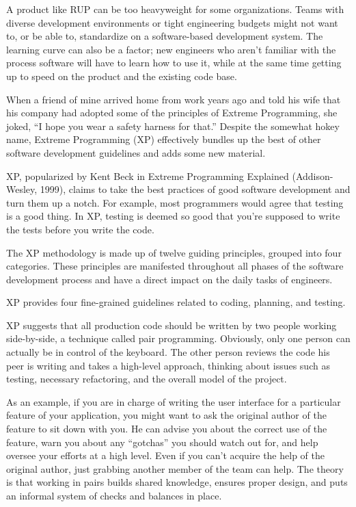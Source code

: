 A product like RUP can be too heavyweight for some organizations. Teams with diverse development environments or tight engineering budgets might not want to, or be able to, standardize on a software-based development system. The learning curve can also be a factor; new engineers who aren’t familiar with the process software will have to learn how to use it, while at the same time getting up to speed on the product and the existing code base.


When a friend of mine arrived home from work years ago and told his wife that his company had adopted some of the principles of Extreme Programming, she joked, “I hope you wear a safety harness for that.” Despite the somewhat hokey name, Extreme Programming (XP) effectively bundles up the best of other software development guidelines and adds some new material.

XP, popularized by Kent Beck in Extreme Programming Explained (Addison-Wesley, 1999), claims to take the best practices of good software development and turn them up a notch. For example, most programmers would agree that testing is a good thing. In XP, testing is deemed so good that you’re supposed to write the tests before you write the code.


The XP methodology is made up of twelve guiding principles, grouped into four categories. These principles are manifested throughout all phases of the software development process and have a direct impact on the daily tasks of engineers.


XP provides four fine-grained guidelines related to coding, planning, and testing.


XP suggests that all production code should be written by two people working side-by-side, a technique called pair programming. Obviously, only one person can actually be in control of the keyboard. The other person reviews the code his peer is writing and takes a high-level approach, thinking about issues such as testing, necessary refactoring, and the overall model of the project.

As an example, if you are in charge of writing the user interface for a particular feature of your application, you might want to ask the original author of the feature to sit down with you. He can advise you about the correct use of the feature, warn you about any “gotchas” you should watch out for, and help oversee your efforts at a high level. Even if you can’t acquire the help of the original author, just grabbing another member of the team can help. The theory is that working in pairs builds shared knowledge, ensures proper design, and puts an informal system of checks and balances in place.

